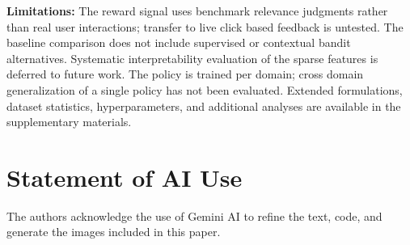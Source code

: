 \documentclass[sigconf]{acmart}
\begin{document}
\textbf{Limitations:} The reward signal uses benchmark relevance judgments rather than real user interactions; transfer to live click based feedback is untested. The baseline comparison does not include supervised or contextual bandit alternatives. Systematic interpretability evaluation of the sparse features is deferred to future work. The policy is trained per domain; cross domain generalization of a single policy has not been evaluated. Extended formulations, dataset statistics, hyperparameters, and additional analyses are available in the supplementary materials.

\section*{Statement of AI Use}
The authors acknowledge the use of Gemini AI to refine the text, code, and generate the images included in this paper.


\end{document}
